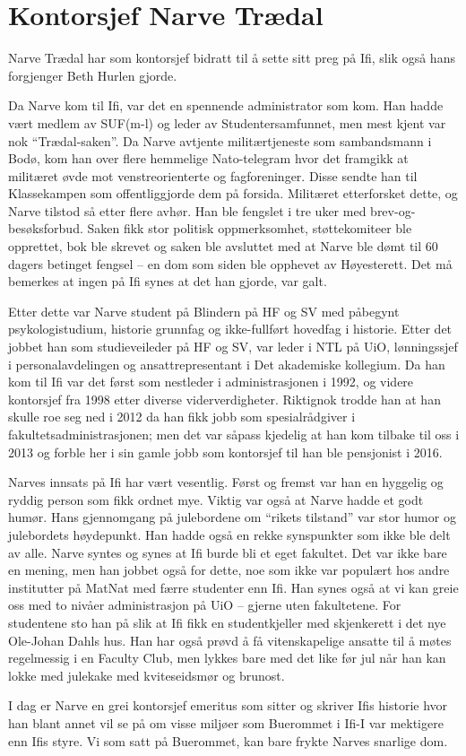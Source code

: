 \chapter{Kontorsjef Narve Trædal}

\author{Skrevet av Dag Langmyhr og Arne Maus}

Narve Trædal har som kontorsjef bidratt til å sette sitt preg på Ifi, slik også hans forgjenger Beth Hurlen gjorde.

Da Narve kom til Ifi, var det en spennende administrator som kom. Han hadde vært medlem av SUF(m-l) og leder av Studentersamfunnet, men mest kjent var nok ``Trædal-saken''. Da Narve avtjente militærtjeneste som sambandsmann i Bodø, kom han over flere hemmelige Nato-telegram hvor det framgikk at militæret øvde mot venstreorienterte og fagforeninger. Disse sendte han til Klassekampen som offentliggjorde dem på forsida. Militæret etterforsket dette, og Narve tilstod så etter flere avhør. Han ble fengslet i tre uker med brev-og-besøksforbud. Saken fikk stor politisk oppmerksomhet, støttekomiteer ble opprettet, bok ble skrevet og saken ble avsluttet med at Narve ble dømt til 60 dagers betinget fengsel – en dom som siden ble opphevet av Høyesterett. Det må bemerkes at ingen på Ifi synes at det han gjorde, var galt.

Etter dette var Narve student på Blindern på HF og SV med påbegynt psykologistudium, historie grunnfag og ikke-fullført hovedfag i historie. Etter det jobbet han som studieveileder på HF og SV, var leder i NTL på UiO, lønningssjef i personalavdelingen og ansattrepresentant i Det akademiske kollegium. Da han kom til Ifi var det først som nestleder i administrasjonen i 1992, og videre kontorsjef fra 1998 etter diverse viderverdigheter. Riktignok trodde han at han skulle roe seg ned i 2012 da han fikk jobb som spesialrådgiver i fakultetsadministrasjonen; men det var såpass kjedelig at han kom tilbake til oss i 2013 og forble her i sin gamle jobb som kontorsjef til han ble pensjonist i 2016.

Narves innsats på Ifi har vært vesentlig. Først og fremst var han en hyggelig og ryddig person som fikk ordnet mye. Viktig var også at Narve hadde et godt humør. Hans gjennomgang på julebordene om ``rikets tilstand'' var stor humor og julebordets høydepunkt. Han hadde også en rekke synspunkter som ikke ble delt av alle. Narve syntes og synes at Ifi burde bli et eget fakultet. Det var ikke bare en mening, men han jobbet også for dette, noe som ikke var populært hos andre institutter på MatNat med færre studenter enn Ifi. Han synes også at vi kan greie oss med to nivåer administrasjon på UiO – gjerne uten fakultetene. For studentene sto han på slik at Ifi fikk en studentkjeller med skjenkerett i det nye Ole-Johan Dahls hus. Han har også prøvd å få vitenskapelige ansatte til å møtes regelmessig i en Faculty Club, men lykkes bare med det like før jul når han kan lokke med julekake med kviteseidsmør og brunost.

I dag er Narve en grei kontorsjef emeritus som sitter og skriver Ifis historie hvor han blant annet vil se på om visse miljøer som Buerommet i Ifi-I var mektigere enn Ifis styre. Vi som satt på Buerommet, kan bare frykte Narves snarlige dom.
